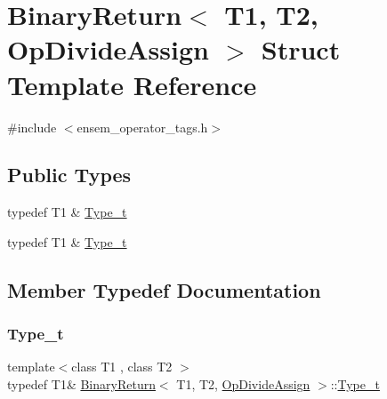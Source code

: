 \hypertarget{structBinaryReturn_3_01T1_00_01T2_00_01OpDivideAssign_01_4}{}\section{Binary\+Return$<$ T1, T2, Op\+Divide\+Assign $>$ Struct Template Reference}
\label{structBinaryReturn_3_01T1_00_01T2_00_01OpDivideAssign_01_4}


{\ttfamily \#include $<$ensem\+\_\+operator\+\_\+tags.\+h$>$}

\subsection*{Public Types}
\begin{DoxyCompactItemize}
\item 
typedef T1 \& \mbox{\hyperlink{structBinaryReturn_3_01T1_00_01T2_00_01OpDivideAssign_01_4_adc3c915034f321213a7e76979b881a0d}{Type\+\_\+t}}
\item 
typedef T1 \& \mbox{\hyperlink{structBinaryReturn_3_01T1_00_01T2_00_01OpDivideAssign_01_4_adc3c915034f321213a7e76979b881a0d}{Type\+\_\+t}}
\end{DoxyCompactItemize}


\subsection{Member Typedef Documentation}
\mbox{\label{structBinaryReturn_3_01T1_00_01T2_00_01OpDivideAssign_01_4_adc3c915034f321213a7e76979b881a0d}} 
\subsubsection{\texorpdfstring{Type\_t}{Type\_t}\hspace{0.1cm}{\footnotesize\ttfamily [1/2]}}
{\footnotesize\ttfamily template$<$class T1 , class T2 $>$ \\
typedef T1\& \mbox{\hyperlink{structBinaryReturn}{Binary\+Return}}$<$ T1, T2, \mbox{\hyperlink{structOpDivideAssign}{Op\+Divide\+Assign}} $>$\+::\mbox{\hyperlink{structBinaryReturn_3_01T1_00_01T2_00_01OpDivideAssign_01_4_adc3c915034f321213a7e76979b881a0d}{Type\+\_\+t}}}

